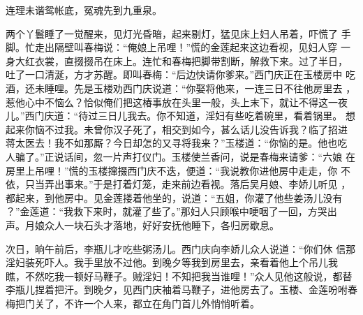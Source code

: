 连理未谐鸳帐底，冤魂先到九重泉。

两个丫鬟睡了一觉醒来，见灯光昏暗，起来剔灯，猛见床上妇人吊着，吓慌了
手脚。忙走出隔壁叫春梅说：“俺娘上吊哩！”慌的金莲起来这边看视，见妇人穿
一身大红衣裳，直掇掇吊在床上。连忙和春梅把脚带割断，解救下来。过了半日，
吐了一口清涎，方才苏醒。即叫春梅：“后边快请你爹来。”西门庆正在玉楼房中
吃酒，还未睡哩。先是玉楼劝西门庆说道：“你娶将他来，一连三日不往他房里去
，惹他心中不恼么？恰似俺们把这椿事放在头里一般，头上末下，就让不得这一夜
儿。”西门庆道：“待过三日儿我去。你不知道，淫妇有些吃着碗里，看着锅里。
想起来你恼不过我。未曾你汉子死了，相交到如今，甚么话儿没告诉我？临了招进
蒋太医去！我不如那厮？今日却怎的又寻将我来？”玉楼道：“你恼的是。他也吃
人骗了。”正说话间，忽一片声打仪门。玉楼使兰香问，说是春梅来请爹：“六娘
在房里上吊哩！”慌的玉楼撺掇西门庆不迭，便道：“我说教你进他房中走走，你
不依，只当弄出事来。”于是打着灯笼，走来前边看视。落后吴月娘、李娇儿听见
，都起来，到他房中。见金莲搂着他坐的，说道：“五姐，你灌了他些姜汤儿没有
？”金莲道：“我救下来时，就灌了些了。”那妇人只顾喉中哽咽了一回，方哭出
声。月娘众人一块石头才落地，好好安抚他睡下，各归房歇息。

次日，晌午前后，李瓶儿才吃些粥汤儿。西门庆向李娇儿众人说道：“你们休
信那淫妇装死吓人。我手里放不过他。到晚夕等我到房里去，亲看着他上个吊儿我
瞧，不然吃我一顿好马鞭子。贼淫妇！不知把我当谁哩！”众人见他这般说，都替
李瓶儿捏着把汗。到晚夕，见西门庆袖着马鞭子，进他房去了。玉楼、金莲吩咐春
梅把门关了，不许一个人来，都立在角门首儿外悄悄听着。

